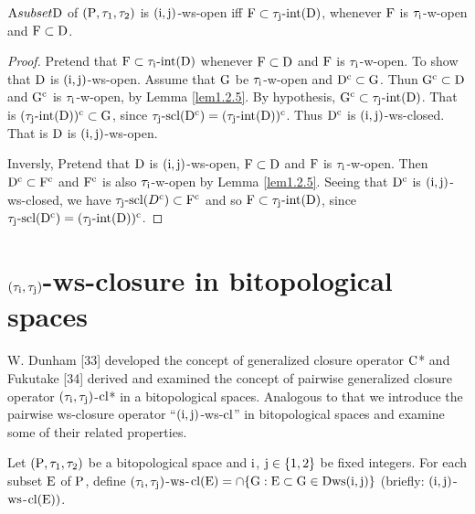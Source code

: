 \begin{thm}\label{thm7.3.6}
$\mathrm{A} subset \mathrm{D}$ of $(\mathrm{P}, \tau_1, \tau_2 )$ is $(\mathrm{i}, \mathrm{j})$-ws-open iff $\mathrm{F}\subset \tau_{\mathrm{j}}\text{-int}(\mathrm{D})$, whenever $\mathrm{F}$ is $\tau_{\mathrm{i}}$-w-open and $\mathrm{F}\subset \mathrm{D}$.
\end{thm}

\begin{proof}
Pretend that $\mathrm{F}\subset \tau_{\mathrm{i}}\text{-int}(\mathrm{D})$ whenever $\mathrm{F}\subset \mathrm{D}$ and $\mathrm{F}$ is $\tau_{\mathrm{i}}$-w-open. To show that $\mathrm{D}$ is $(\mathrm{i}, \mathrm{j})$-ws-open. Assume that $\mathrm{G}$ be $\tau_{\mathrm{i}}$-w-open and $\mathrm{D}^{\text{c}} \subset \mathrm{G}$. Thun $\mathrm{G}^{\text{c}} \subset \mathrm{D}$ and $\mathrm{G}^{\text{c}}$ is $\tau_{\mathrm{i}}$-w-open, by Lemma \ref{lem1.2.5}. By hypothesis, $\mathrm{G}^{\text{c}} \subset \tau_{\mathrm{j}}\text{-int}(\mathrm{D})$. That is $(\tau_{\mathrm{j}}\text{-int}(\mathrm{D}))^{\text{c}} \subset \mathrm{G}$, since $\tau_{\mathrm{j}}\text{-scl}(\mathrm{D}^{\text{c}})=(\tau_{\mathrm{j}}\text{-int}(\mathrm{D}))^{\text{c}}$. Thus $\mathrm{D}^{\text{c}}$ is $(\mathrm{i}, \mathrm{j})$-ws-closed. That is $\mathrm{D}$ is $(\mathrm{i}, \mathrm{j})$-ws-open. 

Inversly, Pretend that $\mathrm{D}$ is $(\mathrm{i}, \mathrm{j})$-ws-open, $\mathrm{F}\subset\mathrm{D}$ and $\mathrm{F}$ is $\tau_{\mathrm{i}}$-w-open. Then $\mathrm{D}^{\text{c}} \subset \mathrm{F}^{\text{c}}$ and $\mathrm{F}^{\text{c}}$ is also $\tau_{\mathrm{i}}$-w-open by Lemma \ref{lem1.2.5}. Seeing that $\mathrm{D}^{\text{c}}$ is $(\mathrm{i}, \mathrm{j})$-ws-closed, we have $\tau_{\mathrm{j}}\text{-scl}(D^{\text{c}}) \subset \mathrm{F}^{\text{c}}$ and so $\mathrm{F}\subset \tau_{\mathrm{j}}\text{-int}(\mathrm{D})$, since $\tau_{\mathrm{j}}\text{-scl}(\mathrm{D}^{\text{c}}) = (\tau_{\mathrm{j}}\text{-int}(\mathrm{D}))^{\text{c}}$.
\end{proof}


\section{\boldmath$(\tau_{\mathrm{i}}, \tau_{\mathrm{j}} )$-ws-closure in bitopological spaces}\label{sec7.3}

W. Dunham [33] developed the concept of generalized closure operator $\mathrm{C}$* and Fukutake [34] derived and examined the concept of pairwise generalized closure operator $(\tau_{\mathrm{i}},\tau_{\mathrm{j}} )$-$\mathrm{cl}$* in a bitopological spaces. Analogous to that we introduce the pairwise ws-closure operator ``$(\mathrm{i}, \mathrm{j})$-ws-$\mathrm{cl}$'' in bitopological spaces and examine some of their related properties.

\begin{dfn}\label{defi7.3.1}
Let $(\mathrm{P}, \tau_1, \tau_2 )$ be a bitopological space and $\mathrm{i}$, $\mathrm{j}\in\{1, 2\}$ be fixed integers. For each subset $\mathrm{E}$ of $\mathrm{P}$, define $(\tau_{\mathrm{i}}, \tau_{\mathrm{j}} )$-$\mathrm{ws}$-$\mathrm{cl}(\mathrm{E})= \cap \{\mathrm{G}: \mathrm{E} \subset \mathrm{G}\in\mathrm{D} \mathrm{ws} (\mathrm{i}, \mathrm{j})\}$ (briefly: $(\mathrm{i}, \mathrm{j})$-$\mathrm{ws}$-$\mathrm{cl}(\mathrm{E}))$.
\end{dfn}

